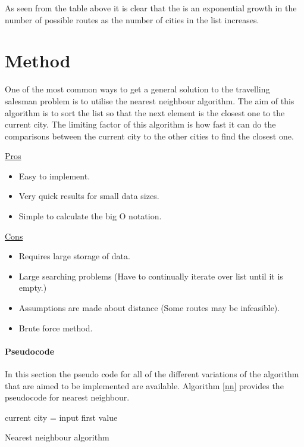 \documentclass[conference,backref=page]{acmsiggraph}
\begin{document}
As seen from the table above it is clear that the is an exponential growth in the number of possible routes as the number of cities in the list increases.

\section{Method}

One of the most common ways to get a general solution to the travelling salesman problem is to utilise the nearest neighbour algorithm. The aim of this algorithm is to sort the list so that the next element is the closest one to the current city. The limiting factor of this algorithm is how fast it can do the comparisons between the current city to the other cities to find the closest one.


\underline{Pros}
\begin{itemize}
	\item Easy to implement.
	\item Very quick results for small data sizes.
	\item Simple to calculate the big O notation.
	
\end{itemize}

\underline{Cons}
\begin{itemize}
	\item Requires large storage of data. 
	\item Large searching problems (Have to continually iterate over list until it is empty.)
	\item Assumptions are made about distance (Some routes may be infeasible).
	\item Brute force method.
\end{itemize}

\paragraph{Pseudocode} \hfill

In this section the pseudo code for all of the different variations of the algorithm that are aimed to be implemented are available. Algorithm \ref{nn} provides the pseudocode for nearest neighbour.

\begin{algorithm}[h]	
	current city = input first value\\
\caption{Nearest neighbour algorithm}
\label{nn}

\end{algorithm}
\end{document}
